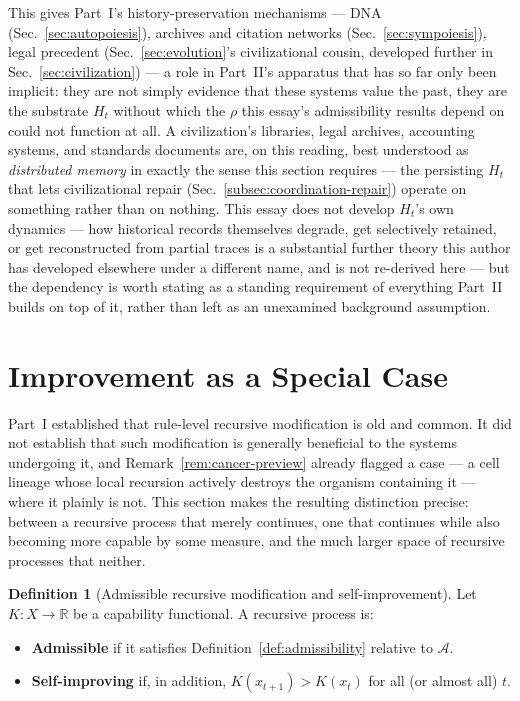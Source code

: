 \documentclass[11pt,a4paper]{article}
\theoremstyle{plain}
\theoremstyle{definition}
\newtheorem{definition}[theorem]{Definition}
\theoremstyle{remark}
\newcommand{\Adm}{\mathcal{A}}
\begin{document}
This gives Part~I's history-preservation mechanisms — DNA (Sec.~\ref{sec:autopoiesis}), archives and citation networks (Sec.~\ref{sec:sympoiesis}), legal precedent (Sec.~\ref{sec:evolution}'s civilizational cousin, developed further in Sec.~\ref{sec:civilization}) — a role in Part~II's apparatus that has so far only been implicit: they are not simply evidence that these systems value the past, they are the substrate $H_t$ without which the $\rho$ this essay's admissibility results depend on could not function at all. A civilization's libraries, legal archives, accounting systems, and standards documents are, on this reading, best understood as \emph{distributed memory} in exactly the sense this section requires — the persisting $H_t$ that lets civilizational repair (Sec.~\ref{subsec:coordination-repair}) operate on something rather than on nothing. This essay does not develop $H_t$'s own dynamics — how historical records themselves degrade, get selectively retained, or get reconstructed from partial traces is a substantial further theory this author has developed elsewhere under a different name, and is not re-derived here — but the dependency is worth stating as a standing requirement of everything Part~II builds on top of it, rather than left as an unexamined background assumption.

\section{Improvement as a Special Case}
\label{sec:improvement-special-case}

Part~I established that rule-level recursive modification is old and common. It did not establish that such modification is generally beneficial to the systems undergoing it, and Remark~\ref{rem:cancer-preview} already flagged a case — a cell lineage whose local recursion actively destroys the organism containing it — where it plainly is not. This section makes the resulting distinction precise: between a recursive process that merely continues, one that continues while also becoming more capable by some measure, and the much larger space of recursive processes that neither.

\begin{definition}[Admissible recursive modification and self-improvement]
\label{def:arm-and-rsi}
Let $K: X \to \mathbb{R}$ be a capability functional. A recursive process is:
\begin{itemize}
  \item \textbf{Admissible} if it satisfies Definition~\ref{def:admissibility} relative to $\Adm$.
  \item \textbf{Self-improving} if, in addition, $K(x_{t+1}) > K(x_t)$ for all (or almost all) $t$.
\end{itemize}
\end{definition}
\end{document}
